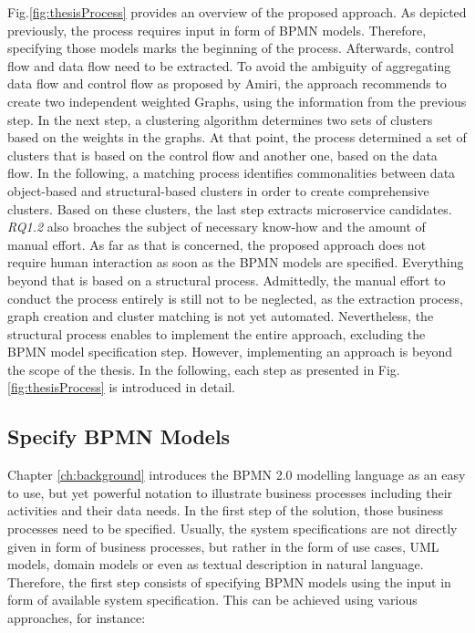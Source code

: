 \noindent
Fig.\ref{fig:thesisProcess} provides an overview of the proposed approach. As depicted previously, the process requires input in form of BPMN models. Therefore, specifying those models marks the beginning of the process. Afterwards, control flow and data flow need to be extracted. To avoid the ambiguity of aggregating data flow and control flow as proposed by Amiri, the approach recommends to create two independent weighted Graphs, using the information from the previous step. In the next step, a clustering algorithm determines two sets of clusters based on the weights in the graphs. At that point, the process determined a set of clusters that is based on the control flow and another one, based on the data flow. In the following, a matching process identifies commonalities between data object-based and structural-based clusters in order to create comprehensive clusters. Based on these clusters, the last step extracts microservice candidates. \\
\textit{RQ1.2} also broaches the subject of necessary know-how and the amount of manual effort. As far as that is concerned, the proposed approach does not require human interaction as soon as the BPMN models are specified. Everything beyond that is based on a structural process.
Admittedly, the manual effort to conduct the process entirely is still not to be neglected, as the extraction process, graph creation and cluster matching is not yet automated. Nevertheless, the structural process enables to implement the entire approach, excluding the BPMN model specification step. However, implementing an approach is beyond the scope of the thesis. In the following, each step as presented in Fig.\ref{fig:thesisProcess} is introduced in detail.


\subsection{Specify BPMN Models}
\label{sec:Solution:SpecifyBPMN}
Chapter \ref{ch:background} introduces the BPMN 2.0 modelling language as an easy to use, but yet powerful notation to illustrate business processes including their activities and their data needs.
In the first step of the solution, those business processes need to be specified. Usually, the system specifications are not directly given in form of business processes, but rather in the form of use cases, UML models, domain models or even as textual description in natural language. Therefore, the first step consists of specifying BPMN models using the input in form of available system specification. This can be achieved using various approaches, for instance: \\





